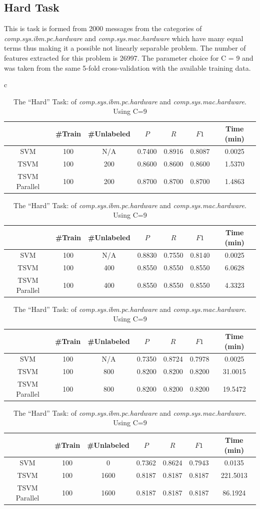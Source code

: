 \subsection{Hard Task}

This is task is formed from 2000 messages from the categories of \emph{comp.sys.ibm.pc.hardware}
and\emph{ comp.sys.mac.hardware} which have many equal terms thus
making it a possible not linearly separable problem. The number of
features extracted for this problem is 26997. The parameter choice
for C = 9 and was taken from the same 5-fold cross-validation with
the available training data.

%
\begin{table}
\begin{longtable}{c}
\begin{tabular}{|c|c|c|c|c|c||c|}
\hline 
 & \#Train & \#Unlabeled & $P$  & $R$  & $F1$  & Time (min)\tabularnewline
\hline 
SVM & 100 & N/A & 0.7400 & 0.8916 & 0.8087 & 0.0025\tabularnewline
\hline 
TSVM & 100 & 200 & 0.8600 & 0.8600 & 0.8600 & 1.5370\tabularnewline
\hline 
TSVM Parallel & 100 & 200 & 0.8700 & 0.8700 & 0.8700 & 1.4863\tabularnewline
\hline
\end{tabular}\tabularnewline
\tabularnewline
\begin{tabular}{|c|c|c|c|c|c||c|}
\hline 
 & \#Train & \#Unlabeled & $P$  & $R$  & $F1$  & Time (min)\tabularnewline
\hline 
SVM & 100 & N/A & 0.8830 & 0.7550 & 0.8140 & 0.0025\tabularnewline
\hline 
TSVM & 100 & 400 & 0.8550 & 0.8550 & 0.8550 & 6.0628\tabularnewline
\hline 
TSVM Parallel & 100 & 400 & 0.8550 & 0.8550 & 0.8550 & 4.3323\tabularnewline
\hline
\end{tabular}\tabularnewline
\tabularnewline
\begin{tabular}{|c|c|c|c|c|c||c|}
\hline 
 & \#Train & \#Unlabeled & $P$  & $R$  & $F1$  & Time (min)\tabularnewline
\hline
\hline 
SVM & 100 & N/A & 0.7350 & 0.8724 & 0.7978 & 0.0025\tabularnewline
\hline 
TSVM & 100 & 800 & 0.8200 & 0.8200 & 0.8200 & 31.0015\tabularnewline
\hline 
TSVM Parallel & 100 & 800 & 0.8200 & 0.8200 & 0.8200 & 19.5472\tabularnewline
\hline
\end{tabular}\tabularnewline
\tabularnewline
\begin{tabular}{|c|c|c|c|c|c||c|}
\hline 
 & \#Train & \#Unlabeled & $P$  & $R$  & $F1$  & Time (min)\tabularnewline
\hline
\hline 
SVM & 100 & 0 & 0.7362 & 0.8624 & 0.7943 & 0.0135\tabularnewline
\hline 
TSVM & 100 & 1600 & 0.8187 & 0.8187 & 0.8187 & 221.5013\tabularnewline
\hline 
TSVM Parallel & 100 & 1600 & 0.8187 & 0.8187 & 0.8187 & 86.1924\tabularnewline
\hline
\end{tabular}\tabularnewline
\tabularnewline
\tabularnewline
\tabularnewline
\end{longtable}

\caption{The {}``Hard'' Task:\emph{ }of \emph{comp.sys.ibm.pc.hardware} and\emph{
comp.sys.mac.hardware}. Using C=9 \label{tab:Hard-Task:comp.graphics-and} }

\end{table}

